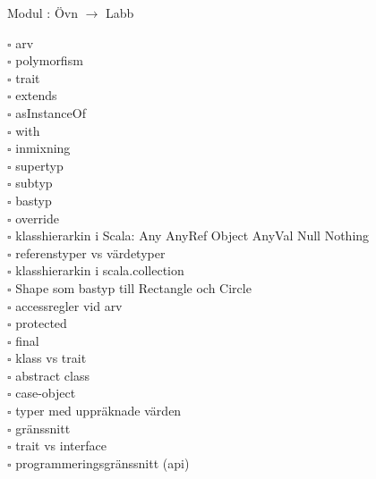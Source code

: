 
Modul : Övn  $\rightarrow$ Labb 
\begin{multicols}{3}\SlideFontTiny
$\square$ arv \\
$\square$ polymorfism \\
$\square$ trait \\
$\square$ extends \\
$\square$ asInstanceOf \\
$\square$ with \\
$\square$ inmixning \\
$\square$ supertyp \\
$\square$ subtyp \\
$\square$ bastyp \\
$\square$ override \\
$\square$ klasshierarkin i Scala: Any AnyRef Object AnyVal Null Nothing \\
$\square$ referenstyper vs värdetyper \\
$\square$ klasshierarkin i scala.collection \\
$\square$ Shape som bastyp till Rectangle och Circle \\
$\square$ accessregler vid arv \\
$\square$ protected \\
$\square$ final \\
$\square$ klass vs trait \\
$\square$ abstract class \\
$\square$ case-object \\
$\square$ typer med uppräknade värden \\
$\square$ gränssnitt \\
$\square$ trait vs interface \\
$\square$ programmeringsgränssnitt (api) \\     
\end{multicols}
